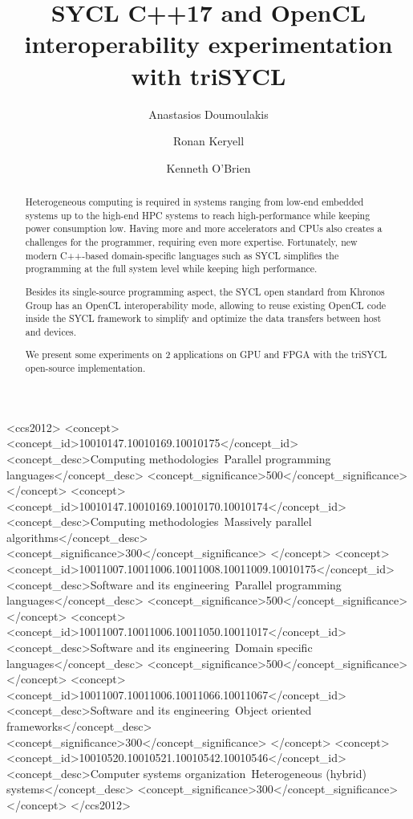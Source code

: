 \documentclass[sigplan, review]{acmart}
\begin{document}
\title{SYCL C++17 and OpenCL interoperability experimentation with
  triSYCL}

\author{Anastasios Doumoulakis}

\author{Ronan Keryell}

\author{Kenneth O'Brien}



\begin{abstract}
  Heterogeneous computing is required in systems ranging from low-end
  embedded systems up to the high-end HPC systems to reach
  high-performance while keeping power consumption low. Having more
  and more accelerators and CPUs also creates a challenges for the programmer,
  requiring even more expertise. Fortunately, new modern
  C++-based domain-specific languages such as SYCL simplifies
  the programming at the full system level while keeping high
  performance.

  Besides its single-source programming aspect, the SYCL open standard
  from Khronos Group has an OpenCL interoperability mode, allowing to
  reuse existing OpenCL code inside the SYCL framework to simplify and
  optimize the data transfers between host and devices.

  We present some experiments on 2 applications on GPU and FPGA with
  the triSYCL open-source implementation.
\end{abstract}

%
\begin{CCSXML}
<ccs2012>
<concept>
<concept_id>10010147.10010169.10010175</concept_id>
<concept_desc>Computing methodologies~Parallel programming languages</concept_desc>
<concept_significance>500</concept_significance>
</concept>
<concept>
<concept_id>10010147.10010169.10010170.10010174</concept_id>
<concept_desc>Computing methodologies~Massively parallel algorithms</concept_desc>
<concept_significance>300</concept_significance>
</concept>
<concept>
<concept_id>10011007.10011006.10011008.10011009.10010175</concept_id>
<concept_desc>Software and its engineering~Parallel programming languages</concept_desc>
<concept_significance>500</concept_significance>
</concept>
<concept>
<concept_id>10011007.10011006.10011050.10011017</concept_id>
<concept_desc>Software and its engineering~Domain specific languages</concept_desc>
<concept_significance>500</concept_significance>
</concept>
<concept>
<concept_id>10011007.10011006.10011066.10011067</concept_id>
<concept_desc>Software and its engineering~Object oriented frameworks</concept_desc>
<concept_significance>300</concept_significance>
</concept>
<concept>
<concept_id>10010520.10010521.10010542.10010546</concept_id>
<concept_desc>Computer systems organization~Heterogeneous (hybrid) systems</concept_desc>
<concept_significance>300</concept_significance>
</concept>
</ccs2012>
\end{CCSXML}
\end{document}
